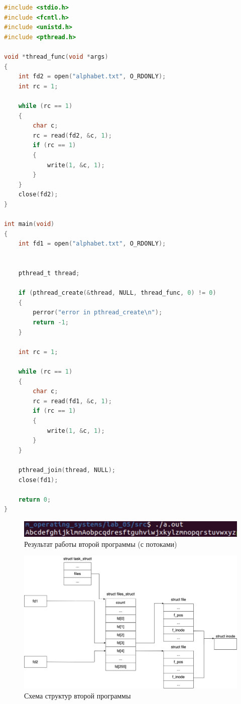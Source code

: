 \documentclass[12pt]{report}
\begin{document}
\begin{lstlisting}[language=c, label=p2thread, caption=Вторая программа (с потоками)]
#include <stdio.h>
#include <fcntl.h>
#include <unistd.h>
#include <pthread.h>

void *thread_func(void *args)
{
    int fd2 = open("alphabet.txt", O_RDONLY);
    int rc = 1;

    while (rc == 1)
    {
        char c;
        rc = read(fd2, &c, 1);
        if (rc == 1)
        {
            write(1, &c, 1);
        }
    }
    close(fd2);
}

int main(void)
{
    int fd1 = open("alphabet.txt", O_RDONLY);
    

    pthread_t thread;

    if (pthread_create(&thread, NULL, thread_func, 0) != 0)
	{
		perror("error in pthread_create\n");
		return -1;
	}

    int rc = 1;

    while (rc == 1)
    {
        char c;
        rc = read(fd1, &c, 1);
        if (rc == 1)
        {
            write(1, &c, 1);
        }
    }

    pthread_join(thread, NULL);
    close(fd1);

    return 0;
}

\end{lstlisting}



\begin{figure}[H]
	\centering
	\includegraphics[scale=1]{img/prog_02_thread.png}
	\caption{Результат работы второй программы (с потоками)}
	\label{fig:prog_02_thread}
\end{figure}


\begin{figure}[H]
	\centering
	\includegraphics[scale=0.4]{img/prog_02_schema.jpg}
	\caption{Схема структур второй программы}
	\label{fig:prog_02_schema}
\end{figure}
\end{document}
